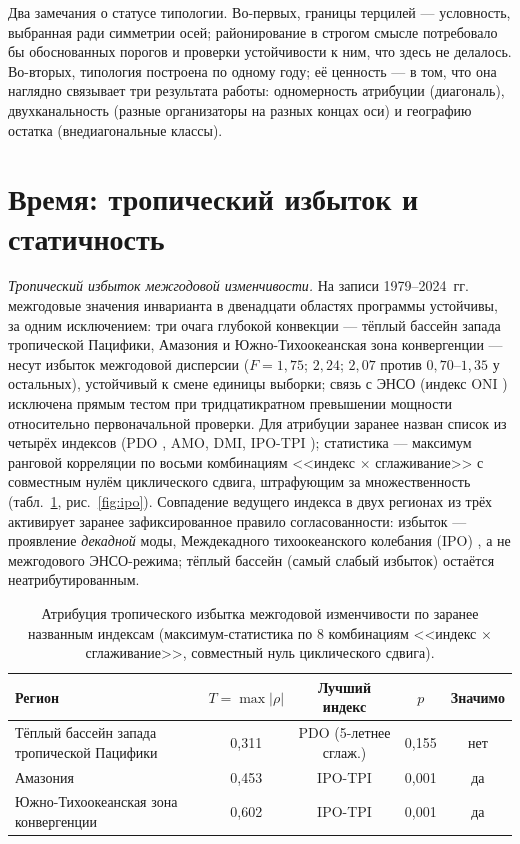 \documentclass[11pt,a4paper]{article}
\begin{document}
Два замечания о статусе типологии. Во-первых, границы терцилей --- условность, выбранная ради симметрии осей; районирование в строгом смысле потребовало бы обоснованных порогов и проверки устойчивости к ним, что здесь не делалось. Во-вторых, типология построена по одному году; её ценность --- в том, что она наглядно связывает три результата работы: одномерность атрибуции (диагональ), двухканальность (разные организаторы на разных концах оси) и географию остатка (внедиагональные классы).

\section{Время: тропический избыток и статичность}
\label{sec:time}

\emph{Тропический избыток межгодовой изменчивости.} На записи 1979--2024~гг. межгодовые значения инварианта в двенадцати областях программы устойчивы, за одним исключением: три очага глубокой конвекции --- тёплый бассейн запада тропической Пацифики, Амазония и Южно-Тихоокеанская зона конвергенции --- несут избыток межгодовой дисперсии ($F=1{,}75$; $2{,}24$; $2{,}07$ против $0{,}70$--$1{,}35$ у остальных), устойчивый к смене единицы выборки; связь с ЭНСО (индекс ONI \cite{Trenberth1997}) исключена прямым тестом при тридцатикратном превышении мощности относительно первоначальной проверки. Для атрибуции заранее назван список из четырёх индексов (PDO \cite{Newman2016}, AMO, DMI, IPO-TPI \cite{Henley2015}); статистика --- максимум ранговой корреляции по восьми комбинациям <<индекс $\times$ сглаживание>> с совместным нулём циклического сдвига, штрафующим за множественность (табл.~\ref{tab:ipo}, рис.~\ref{fig:ipo}). Совпадение ведущего индекса в двух регионах из трёх активирует заранее зафиксированное правило согласованности: избыток --- проявление \emph{декадной} моды, Междекадного тихоокеанского колебания (IPO) \cite{Power1999,Henley2015}, а не межгодового ЭНСО-режима; тёплый бассейн (самый слабый избыток) остаётся неатрибутированным.

\begin{table}[t]
\centering
\caption{Атрибуция тропического избытка межгодовой изменчивости по заранее названным индексам (максимум-статистика по 8 комбинациям <<индекс $\times$ сглаживание>>, совместный нуль циклического сдвига).}
\label{tab:ipo}
\small
\begin{tabular}{@{}lcccc@{}}
\toprule
Регион & $T=\max\lvert\rho\rvert$ & Лучший индекс & $p$ & Значимо\\
\midrule
Тёплый бассейн запада тропической Пацифики & 0,311 & PDO (5-летнее сглаж.) & 0,155 & нет\\
Амазония & 0,453 & IPO-TPI & 0,001 & да\\
Южно-Тихоокеанская зона конвергенции & 0,602 & IPO-TPI & 0,001 & да\\
\bottomrule
\end{tabular}
\end{table}
\end{document}
